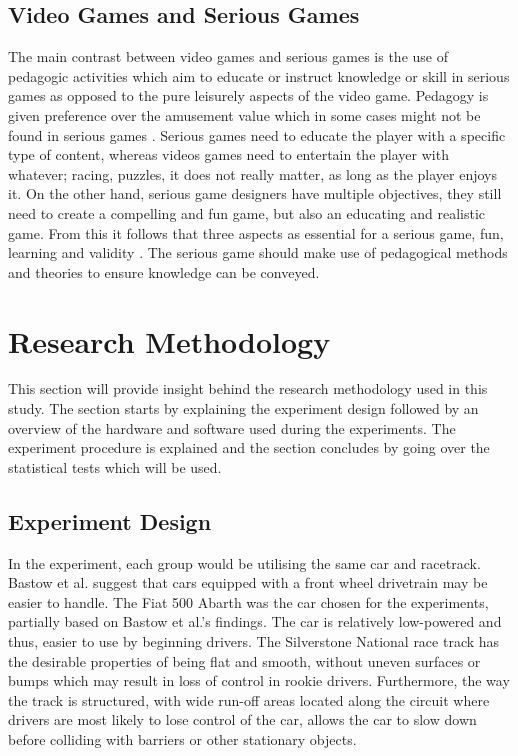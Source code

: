\documentclass{sig-alternate}
\begin{document}
{\subsection{Video Games and Serious Games}
The main contrast between video games and serious games is the use of pedagogic activities which aim to educate or instruct knowledge or skill \cite{zyda2005visual} in serious games as opposed to the pure leisurely aspects of the video game. Pedagogy is given preference over the amusement value which in some cases might not be found in serious games \cite{zyda2005visual}. Serious games need to educate the player with a specific type of content, whereas videos games need to entertain the player with whatever; racing, puzzles, it does not really matter, as long as the player enjoys it\cite{Harteveld2007}. On the other hand, serious game designers have multiple objectives, they still need to create a compelling and fun game, but also an educating and realistic game. From this it follows that three aspects as essential for a serious game, fun, learning and validity \cite{Harteveld2007}. The serious game should make use of pedagogical methods and theories to ensure knowledge can be conveyed.
}
\section{Research Methodology}
\label{sec:Methodology}

This section will provide insight behind the research methodology used in this study. The section starts by explaining the experiment design followed by an overview of the hardware and software used during the experiments. The experiment procedure is explained and the section concludes by going over the statistical tests which will be used.

\subsection{Experiment Design}
In the experiment, each group would be utilising the same car and racetrack. Bastow et al. \cite{bastow2004car} suggest that cars equipped with a front wheel drivetrain may be easier to handle. The Fiat 500 Abarth was the car chosen for the experiments, partially based on Bastow et al.'s findings. The car is relatively low-powered and thus, easier to use by beginning drivers. The Silverstone National race track has the desirable properties of being flat and smooth, without uneven surfaces or bumps which may result in loss of control in rookie drivers. Furthermore, the way the track is structured, with wide run-off areas located along the circuit where drivers are most likely to lose control of the car, allows the car to slow down before colliding with barriers or other stationary objects.
\end{document}
